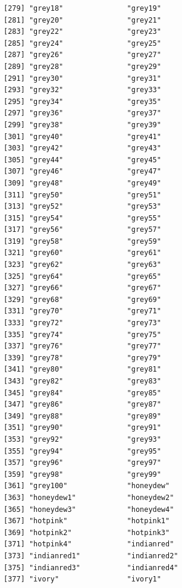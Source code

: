 \documentclass[
  a4paper,
]{article}
\begin{document}
\begin{verbatim}
[279] "grey18"               "grey19"              
[281] "grey20"               "grey21"              
[283] "grey22"               "grey23"              
[285] "grey24"               "grey25"              
[287] "grey26"               "grey27"              
[289] "grey28"               "grey29"              
[291] "grey30"               "grey31"              
[293] "grey32"               "grey33"              
[295] "grey34"               "grey35"              
[297] "grey36"               "grey37"              
[299] "grey38"               "grey39"              
[301] "grey40"               "grey41"              
[303] "grey42"               "grey43"              
[305] "grey44"               "grey45"              
[307] "grey46"               "grey47"              
[309] "grey48"               "grey49"              
[311] "grey50"               "grey51"              
[313] "grey52"               "grey53"              
[315] "grey54"               "grey55"              
[317] "grey56"               "grey57"              
[319] "grey58"               "grey59"              
[321] "grey60"               "grey61"              
[323] "grey62"               "grey63"              
[325] "grey64"               "grey65"              
[327] "grey66"               "grey67"              
[329] "grey68"               "grey69"              
[331] "grey70"               "grey71"              
[333] "grey72"               "grey73"              
[335] "grey74"               "grey75"              
[337] "grey76"               "grey77"              
[339] "grey78"               "grey79"              
[341] "grey80"               "grey81"              
[343] "grey82"               "grey83"              
[345] "grey84"               "grey85"              
[347] "grey86"               "grey87"              
[349] "grey88"               "grey89"              
[351] "grey90"               "grey91"              
[353] "grey92"               "grey93"              
[355] "grey94"               "grey95"              
[357] "grey96"               "grey97"              
[359] "grey98"               "grey99"              
[361] "grey100"              "honeydew"            
[363] "honeydew1"            "honeydew2"           
[365] "honeydew3"            "honeydew4"           
[367] "hotpink"              "hotpink1"            
[369] "hotpink2"             "hotpink3"            
[371] "hotpink4"             "indianred"           
[373] "indianred1"           "indianred2"          
[375] "indianred3"           "indianred4"          
[377] "ivory"                "ivory1"              

\end{verbatim}
\end{document}
